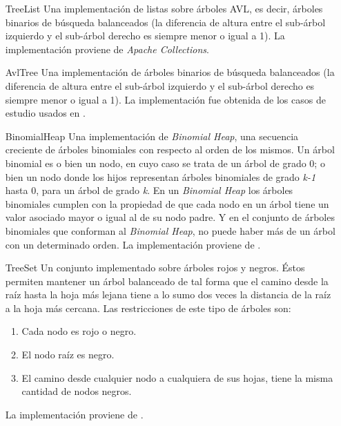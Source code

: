 \begin{enumerate}[leftmargin=.75cm,align=left,style=nextline]
	\item[TreeList] Una implementaci\'on de listas sobre \'arboles AVL, es decir, \'arboles binarios de b\'usqueda balanceados (la diferencia de altura entre el sub-\'arbol izquierdo y el sub-\'arbol derecho es siempre menor o igual a 1). La implementaci\'on proviene de \emph{Apache Collections}.
	
	\item[AvlTree] Una implementaci\'on de \'arboles binarios de b\'usqueda balanceados (la diferencia de altura entre el sub-\'arbol izquierdo y el sub-\'arbol derecho es siempre menor o igual a 1). La implementaci\'on fue obtenida de los casos de estudio usados en \cite{bibliography.testing.generation.SUSHIBraione}.
	
	\item[BinomialHeap] Una implementaci\'on de \emph{Binomial Heap}, una secuencia creciente de \'arboles binomiales con respecto al orden de los mismos. Un \'arbol binomial es o bien un nodo, en cuyo caso se trata de un \'arbol de grado 0; o bien un nodo donde los hijos representan \'arboles binomiales de grado \emph{k-1} hasta 0, para un \'arbol de grado \emph{k}. En un \emph{Binomial Heap} los \'arboles binomiales cumplen con la propiedad de que cada nodo en un \'arbol tiene un valor asociado mayor o igual al de su nodo padre. Y en el conjunto de \'arboles binomiales que conforman al \emph{Binomial Heap}, no puede haber m\'as de un \'arbol con un determinado orden. La implementaci\'on proviene de \cite{bibliography.mutation.tools.TACOGaleottiRPF13}.
	
	\item[TreeSet] Un conjunto implementado sobre \'arboles rojos y negros. \'Estos permiten mantener un \'arbol balanceado de tal forma que el camino desde la ra\'iz hasta la hoja m\'as lejana tiene a lo sumo dos veces la distancia de la ra\'iz a la hoja m\'as cercana. Las restricciones de este tipo de \'arboles son:
	\begin{enumerate}
		\item Cada nodo es rojo o negro.
		\item El nodo ra\'iz es negro.
		\item El camino desde cualquier nodo a cualquiera de sus hojas, tiene la misma cantidad de nodos negros.
	\end{enumerate}
	La implementaci\'on proviene de \cite{bibliography.mutation.tools.TACOGaleottiRPF13}.
	

\end{enumerate}
